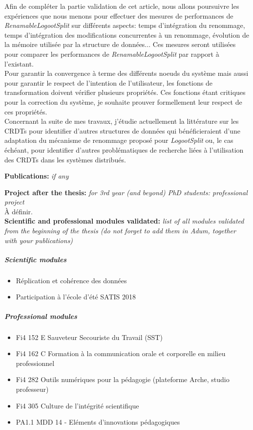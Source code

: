 \documentclass[12pt]{article}
\newcommand{\commentaire}[1]{\small\textit{#1}}
\begin{document}
Afin de compléter la partie validation de cet article, nous allons poursuivre les expériences que nous menons pour effectuer des mesures de performances de \emph{RenamableLogootSplit} sur différents aspects: temps d'intégration du renommage, temps d'intégration des modifications concurrentes à un renommage, évolution de la mémoire utilisée par la structure de données...
Ces mesures seront utilisées pour comparer les performances de \emph{RenamableLogootSplit} par rapport à l'existant.
\\

Pour garantir la convergence à terme des différents noeuds du système mais aussi pour garantir le respect de l'intention de l'utilisateur, les fonctions de transformation doivent vérifier plusieurs propriétés.
Ces fonctions étant critiques pour la correction du système, je souhaite prouver formellement leur respect de ces propriétés.
\\

Concernant la suite de mes travaux, j'étudie actuellement la littérature sur les \acp{CRDT} pour identifier d'autres structures de données qui bénéficieraient d'une adaptation du mécanisme de renommage proposé pour \emph{LogootSplit} ou, le cas échéant, pour identifier d'autres problématiques de recherche liées à l'utilisation des \acp{CRDT} dans les systèmes distribués.
\\

\clearpage

\noindent\textbf{Publications:}
\commentaire{%
  if any}


\nocite{*}

\noindent\textbf{Project after the thesis:}
\commentaire{%
  for 3rd year (and beyond) PhD students: professional project\\}
À définir.
\\

\noindent\textbf{Scientific and professional modules validated:}
\commentaire{%
  list of all modules validated from the beginning of the thesis (do
  not forget to add them in Adum, together with your publications)}
\subparagraph{Scientific modules}
  \begin{itemize}
      \item Réplication et cohérence des données
      \item Participation à l'école d'été SATIS 2018
  \end{itemize}
\subparagraph{Professional modules}
  \begin{itemize}
      \item Fi4 152 E Sauveteur Secouriste du Travail (SST)
      \item Fi4 162 C Formation à la communication orale et corporelle en milieu professionnel
      \item Fi4 282 Outils numériques pour la pédagogie (plateforme Arche, studio professeur)
      \item Fi4 305 Culture de l’intégrité scientifique
      \item PA1.1 MDD 14 - Eléments d’innovations pédagogiques
  \end{itemize}
\end{document}
